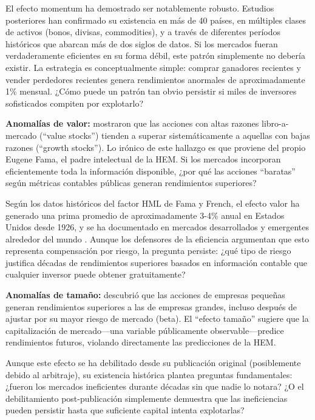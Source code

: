 \documentclass[11pt,a4paper]{article}
\begin{document}
El efecto momentum ha demostrado ser notablemente robusto. Estudios posteriores han confirmado su existencia en más de 40 países, en múltiples clases de activos (bonos, divisas, commodities), y a través de diferentes períodos históricos que abarcan más de dos siglos de datos. Si los mercados fueran verdaderamente eficientes en su forma débil, este patrón simplemente no debería existir. La estrategia es conceptualmente simple: comprar ganadores recientes y vender perdedores recientes genera rendimientos anormales de aproximadamente 1\% mensual. ¿Cómo puede un patrón tan obvio persistir si miles de inversores sofisticados compiten por explotarlo?

\textbf{Anomalías de valor:} \citet{fama1992} mostraron que las acciones con altas razones libro-a-mercado (``value stocks'') tienden a superar sistemáticamente a aquellas con bajas razones (``growth stocks''). Lo irónico de este hallazgo es que proviene del propio Eugene Fama, el padre intelectual de la HEM. Si los mercados incorporan eficientemente toda la información disponible, ¿por qué las acciones ``baratas'' según métricas contables públicas generan rendimientos superiores?

Según los datos históricos del factor HML de Fama y French, el efecto valor ha generado una prima promedio de aproximadamente 3-4\% anual en Estados Unidos desde 1926, y se ha documentado en mercados desarrollados y emergentes alrededor del mundo \citep{fama1992}. Aunque los defensores de la eficiencia argumentan que esto representa compensación por riesgo, la pregunta persiste: ¿qué tipo de riesgo justifica décadas de rendimientos superiores basados en información contable que cualquier inversor puede obtener gratuitamente?

\textbf{Anomalías de tamaño:} \citet{banz1981} descubrió que las acciones de empresas pequeñas generan rendimientos superiores a las de empresas grandes, incluso después de ajustar por su mayor riesgo de mercado (beta). El ``efecto tamaño'' sugiere que la capitalización de mercado---una variable públicamente observable---predice rendimientos futuros, violando directamente las predicciones de la HEM.

Aunque este efecto se ha debilitado desde su publicación original (posiblemente debido al arbitraje), su existencia histórica plantea preguntas fundamentales: ¿fueron los mercados ineficientes durante décadas sin que nadie lo notara? ¿O el debilitamiento post-publicación simplemente demuestra que las ineficiencias pueden persistir hasta que suficiente capital intenta explotarlas?
\end{document}

